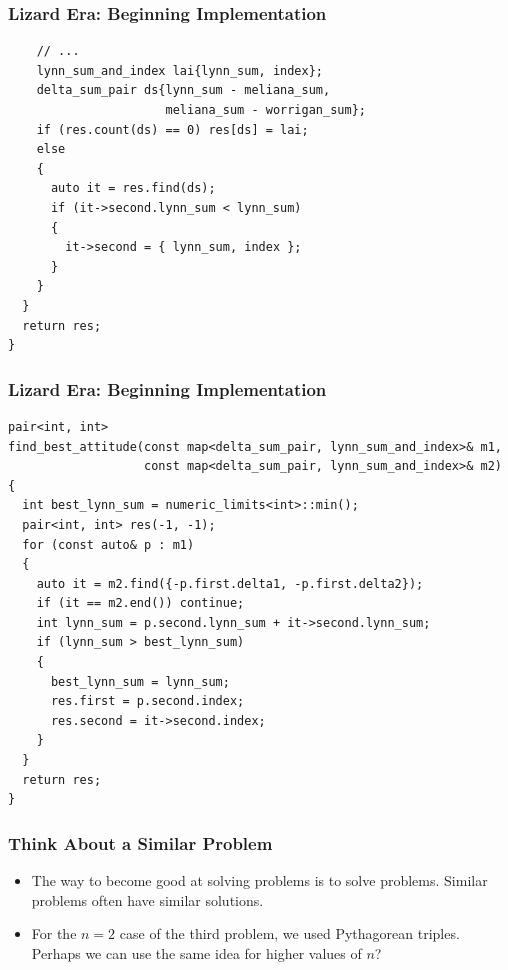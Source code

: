 \documentclass{beamer}
\begin{document}
\begin{frame}[containsverbatim]
\frametitle{Lizard Era: Beginning Implementation}
\scriptsize

\begin{lstlisting}
    // ...
    lynn_sum_and_index lai{lynn_sum, index};
    delta_sum_pair ds{lynn_sum - meliana_sum,
                      meliana_sum - worrigan_sum};
    if (res.count(ds) == 0) res[ds] = lai;
    else
    {
      auto it = res.find(ds);
      if (it->second.lynn_sum < lynn_sum)
      {
        it->second = { lynn_sum, index };
      }
    }
  }
  return res;
}
\end{lstlisting}

\end{frame}

\begin{frame}[containsverbatim]
\frametitle{Lizard Era: Beginning Implementation}
\scriptsize

\begin{lstlisting}
pair<int, int>
find_best_attitude(const map<delta_sum_pair, lynn_sum_and_index>& m1,
                   const map<delta_sum_pair, lynn_sum_and_index>& m2)
{
  int best_lynn_sum = numeric_limits<int>::min();
  pair<int, int> res(-1, -1);
  for (const auto& p : m1)
  {
    auto it = m2.find({-p.first.delta1, -p.first.delta2});
    if (it == m2.end()) continue;
    int lynn_sum = p.second.lynn_sum + it->second.lynn_sum;
    if (lynn_sum > best_lynn_sum)
    {
      best_lynn_sum = lynn_sum;
      res.first = p.second.index;
      res.second = it->second.index;
    }
  }
  return res;
}
\end{lstlisting}

\end{frame}

\fi

\begin{frame}%
\frametitle{Think About a Similar Problem}

\begin{itemize}

\item The way to become good at solving problems is to solve problems. Similar
problems often have similar solutions.

\vspace{0.4cm}

\item<2-> For the $n = 2$ case of the third problem, we used Pythagorean triples. Perhaps we can use
the same idea for higher values of $n$?

\end{itemize}

\end{frame}
\end{document}
